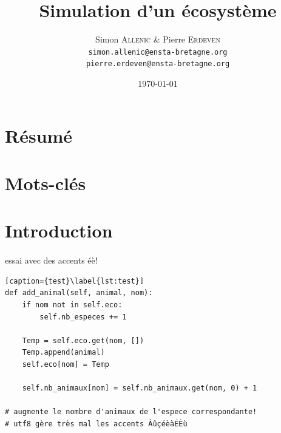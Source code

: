 \documentclass[a4paper,11pt,final,oneside]{article}
\title{Simulation d'un écosystème}
\author{Simon \textsc{Allenic} \& Pierre \textsc{Erdeven}\\
  \texttt{simon.allenic@ensta-bretagne.org} \\
  \texttt{pierre.erdeven@ensta-bretagne.org}}
\date{\today}
\begin{document}
\theoremstyle{plain}
\newtheorem{theo}{Théorème}
\newtheorem{mydef}{Définition}

\clearpage\maketitle
\thispagestyle{empty}
\newpage

\section*{Résumé}

\section*{Mots-clés}

\newpage

\tableofcontents
\newpage

\section*{Introduction}

\paragraph{} essai avec des accents éè!

\begin{lstlisting}[caption={test}\label{lst:test}]
def add_animal(self, animal, nom):
	if nom not in self.eco:
		self.nb_especes += 1

	Temp = self.eco.get(nom, [])
	Temp.append(animal)
	self.eco[nom] = Temp

	self.nb_animaux[nom] = self.nb_animaux.get(nom, 0) + 1
		
# augmente le nombre d'animaux de l'espece correspondante!
# utf8 gère très mal les accents ÂûçéèàÉÈù
\end{lstlisting}
\end{document}
